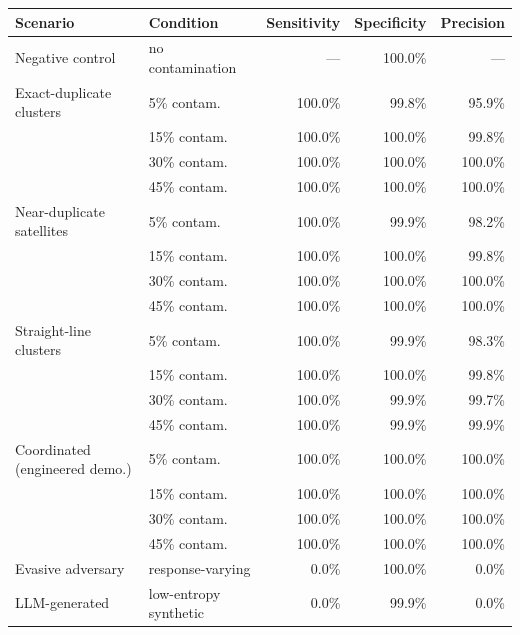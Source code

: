 \begin{tabular}{@{}llrrr@{}}
\toprule
\textbf{Scenario} & \textbf{Condition} & \textbf{Sensitivity} & \textbf{Specificity} & \textbf{Precision} \\
\midrule
Negative control & no contamination & --- & 100.0\% & --- \\
\midrule
Exact-duplicate clusters & 5\% contam. & 100.0\% & 99.8\% & 95.9\% \\
 & 15\% contam. & 100.0\% & 100.0\% & 99.8\% \\
 & 30\% contam. & 100.0\% & 100.0\% & 100.0\% \\
 & 45\% contam. & 100.0\% & 100.0\% & 100.0\% \\
\addlinespace
Near-duplicate satellites & 5\% contam. & 100.0\% & 99.9\% & 98.2\% \\
 & 15\% contam. & 100.0\% & 100.0\% & 99.8\% \\
 & 30\% contam. & 100.0\% & 100.0\% & 100.0\% \\
 & 45\% contam. & 100.0\% & 100.0\% & 100.0\% \\
\addlinespace
Straight-line clusters & 5\% contam. & 100.0\% & 99.9\% & 98.3\% \\
 & 15\% contam. & 100.0\% & 100.0\% & 99.8\% \\
 & 30\% contam. & 100.0\% & 99.9\% & 99.7\% \\
 & 45\% contam. & 100.0\% & 99.9\% & 99.9\% \\
\addlinespace
Coordinated (engineered demo.) & 5\% contam. & 100.0\% & 100.0\% & 100.0\% \\
 & 15\% contam. & 100.0\% & 100.0\% & 100.0\% \\
 & 30\% contam. & 100.0\% & 100.0\% & 100.0\% \\
 & 45\% contam. & 100.0\% & 100.0\% & 100.0\% \\
\addlinespace
\midrule
Evasive adversary & response-varying & 0.0\% & 100.0\% & 0.0\% \\
LLM-generated & low-entropy synthetic & 0.0\% & 99.9\% & 0.0\% \\
\bottomrule
\end{tabular}
